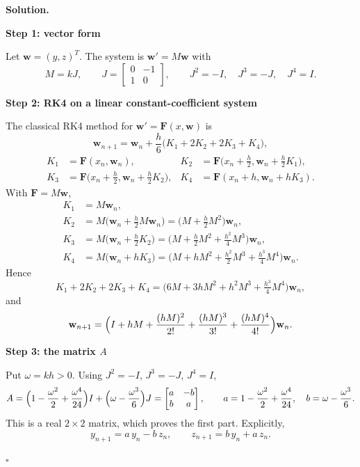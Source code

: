 \documentclass[11pt,a4paper]{article}
\newenvironment{solution}
  {\par\noindent\textbf{Solution.}\par\nobreak}
  {\par\hfill\(\square\)\par}
\newcommand{\step}[1]{\par\addvspace{0.5em}\noindent\textbf{#1}\par\nobreak}
\begin{document}
\begin{solution}
\step{Step 1: vector form}
Let \(\mathbf w=(y,z)^T\).  The system is \(\mathbf w'=M\mathbf w\) with
\[
  M=kJ,\qquad J=\begin{bmatrix}0&-1\\1&0\end{bmatrix},\qquad
  J^2=-I,\quad J^3=-J,\quad J^4=I .
\]

\step{Step 2: RK4 on a linear constant-coefficient system}
The classical RK4 method for \(\mathbf w'=\mathbf F(x,\mathbf w)\) is
\[
  \mathbf w_{n+1}=\mathbf w_n+\frac h6\bigl(K_1+2K_2+2K_3+K_4\bigr),
\]
\begin{align*}
  K_1&=\mathbf F(x_n,\mathbf w_n),&
  K_2&=\mathbf F\bigl(x_n+\tfrac h2,\mathbf w_n+\tfrac h2K_1\bigr),\\
  K_3&=\mathbf F\bigl(x_n+\tfrac h2,\mathbf w_n+\tfrac h2K_2\bigr),&
  K_4&=\mathbf F(x_n+h,\mathbf w_n+hK_3).
\end{align*}
With \(\mathbf F=M\mathbf w\),
\begin{align*}
  K_1&=M\mathbf w_n,\\
  K_2&=M\bigl(\mathbf w_n+\tfrac h2M\mathbf w_n\bigr)
      =\bigl(M+\tfrac h2M^2\bigr)\mathbf w_n,\\
  K_3&=M\bigl(\mathbf w_n+\tfrac h2K_2\bigr)
      =\bigl(M+\tfrac h2M^2+\tfrac{h^2}4M^3\bigr)\mathbf w_n,\\
  K_4&=M\bigl(\mathbf w_n+hK_3\bigr)
      =\bigl(M+hM^2+\tfrac{h^2}2M^3+\tfrac{h^3}4M^4\bigr)\mathbf w_n .
\end{align*}
Hence
\[
  K_1+2K_2+2K_3+K_4
  =\bigl(6M+3hM^2+h^2M^3+\tfrac{h^3}4M^4\bigr)\mathbf w_n,
\]
and
\[
  \mathbf w_{n+1}
  =\Bigl(I+hM+\frac{(hM)^2}{2!}+\frac{(hM)^3}{3!}+\frac{(hM)^4}{4!}\Bigr)\mathbf w_n .
\]

\step{Step 3: the matrix \(A\)}
Put \(\omega=kh>0\).  Using \(J^2=-I\), \(J^3=-J\), \(J^4=I\),
\[
  A=\Bigl(1-\frac{\omega^2}2+\frac{\omega^4}{24}\Bigr)I
   +\Bigl(\omega-\frac{\omega^3}6\Bigr)J
  =\begin{bmatrix}a&-b\\ b&a\end{bmatrix},
  \qquad
  a=1-\frac{\omega^2}2+\frac{\omega^4}{24},\quad
  b=\omega-\frac{\omega^3}6 .
\]
This is a real \(2\times2\) matrix, which proves the first part.
Explicitly,
\[
  y_{n+1}=a\,y_n-b\,z_n,\qquad z_{n+1}=b\,y_n+a\,z_n .
\]


\end{solution}
\end{document}
